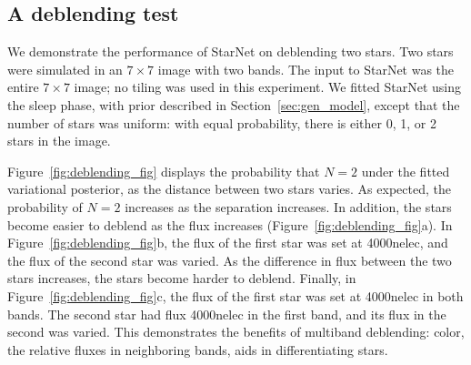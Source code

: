 \subsection{A deblending test}
\label{sec:deblending_test}

We demonstrate the performance of StarNet on deblending two stars. Two stars were simulated in an $7\times 7$ image with two bands. 
The input to StarNet was the entire $7\times 7$ image; no tiling was used in this experiment. 
We fitted StarNet using the sleep phase, with prior described in Section~\ref{sec:gen_model}, except that the number of stars was uniform: with equal probability, there is either 0, 1, or 2 stars in the image. 

Figure~\ref{fig:deblending_fig} displays the probability that $N = 2$ under the fitted variational posterior, as the distance between two stars varies.
As expected, the probability of $N=2$ increases as the separation increases. 
In addition, the stars become easier to deblend as the flux increases (Figure~\ref{fig:deblending_fig}a).
In Figure~\ref{fig:deblending_fig}b, the flux of the first star was set at 4000nelec, and the flux of the second star was varied. 
As the difference in flux between the two stars increases, the stars become harder to deblend. 
Finally, in Figure~\ref{fig:deblending_fig}c, the flux of the first star was set at 4000nelec in both bands. The second star had flux 4000nelec in the first band, and its flux in the second was varied. 
This demonstrates the benefits of multiband deblending: color, 
the relative fluxes in neighboring bands, aids in differentiating stars. 

